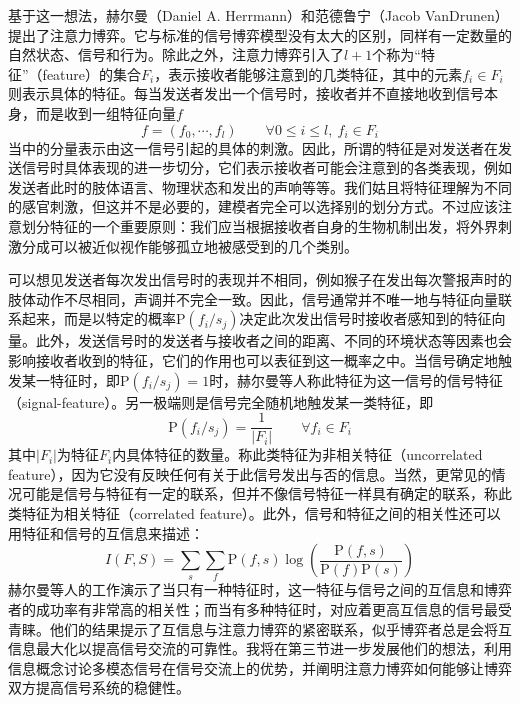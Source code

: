 \documentclass[12pt]{ctexart}  %
\begin{document}
基于这一想法，赫尔曼（Daniel A. Herrmann）和范德鲁宁（Jacob VanDrunen）提出了注意力博弈。\cite{attention}它与标准的信号博弈模型没有太大的区别，同样有一定数量的自然状态、信号和行为。除此之外，注意力博弈引入了$l+1$个称为“特征”（feature）的集合$F_i$，表示接收者能够注意到的几类特征，其中的元素$f_i\in F_i$则表示具体的特征。每当发送者发出一个信号时，接收者并不直接地收到信号本身，而是收到一组特征向量$f$
\begin{equation}
    f=(f_0,\cdots,f_l)\qquad \forall 0\leq i\leq l,\ f_i\in F_i
\end{equation}
当中的分量表示由这一信号引起的具体的刺激。因此，所谓的特征是对发送者在发送信号时具体表现的进一步切分，它们表示接收者可能会注意到的各类表现，例如发送者此时的肢体语言、物理状态和发出的声响等等。我们姑且将特征理解为不同的感官刺激，但这并不是必要的，建模者完全可以选择别的划分方式。不过应该注意划分特征的一个重要原则：我们应当根据接收者自身的生物机制出发，将外界刺激分成可以被近似视作能够孤立地被感受到的几个类别。

可以想见发送者每次发出信号时的表现并不相同，例如猴子在发出每次警报声时的肢体动作不尽相同，声调并不完全一致。因此，信号通常并不唯一地与特征向量联系起来，而是以特定的概率$\text{P}(f_i/s_j)$决定此次发出信号时接收者感知到的特征向量。此外，发送信号时的发送者与接收者之间的距离、不同的环境状态等因素也会影响接收者收到的特征，它们的作用也可以表征到这一概率之中。当信号确定地触发某一特征时，即$\text{P}(f_i/s_j)=1$时，赫尔曼等人称此特征为这一信号的信号特征（signal-feature）。另一极端则是信号完全随机地触发某一类特征，即
\begin{equation}
    \text{P}(f_i/s_j)= \frac{1}{|F_i|}\qquad \forall f_i\in F_i
\end{equation}
其中$|F_i|$为特征$F_i$内具体特征的数量。称此类特征为非相关特征（uncorrelated feature），因为它没有反映任何有关于此信号发出与否的信息。当然，更常见的情况可能是信号与特征有一定的联系，但并不像信号特征一样具有确定的联系，称此类特征为相关特征（correlated feature）。此外，信号和特征之间的相关性还可以用特征和信号的互信息来描述：
\begin{equation}
    I(F,S)=\sum_{s} \sum_{f}\text{P}(f,s) \log(\frac{\text{P}(f,s)}{\text{P}(f)\text{P}(s)})
\end{equation}
赫尔曼等人的工作演示了当只有一种特征时，这一特征与信号之间的互信息和博弈者的成功率有非常高的相关性；而当有多种特征时，对应着更高互信息的信号最受青睐。\cite{attention}他们的结果提示了互信息与注意力博弈的紧密联系，似乎博弈者总是会将互信息最大化以提高信号交流的可靠性。我将在第三节进一步发展他们的想法，利用信息概念讨论多模态信号在信号交流上的优势，并阐明注意力博弈如何能够让博弈双方提高信号系统的稳健性。
\end{document}

